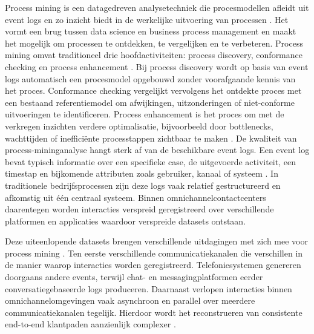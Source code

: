 Process mining is een datagedreven analysetechniek die procesmodellen afleidt uit event logs en zo inzicht biedt in de werkelijke uitvoering van processen \autocite{vanDerAalst2016}. Het vormt een brug tussen data science en business process management en maakt het mogelijk om processen te ontdekken, te vergelijken en te verbeteren.
Process mining omvat traditioneel drie hoofdactiviteiten: process discovery, conformance checking en process enhancement \autocite{vanDerAalst2016,Zelst2020}. Bij process discovery wordt op basis van event logs automatisch een procesmodel opgebouwd zonder voorafgaande kennis van het proces. Conformance checking vergelijkt vervolgens het ontdekte proces met een bestaand referentiemodel om afwijkingen, uitzonderingen of niet-conforme uitvoeringen te identificeren. Process enhancement  is het proces om met de verkregen inzichten verdere optimalisatie, bijvoorbeeld door bottlenecks, wachttijden of inefficiënte processtappen zichtbaar te maken \autocite{vanDerAalst2016}.
De kwaliteit van process-mininganalyse hangt sterk af van de beschikbare event logs. Een event log bevat typisch informatie over een specifieke case, de uitgevoerde activiteit, een timestap en bijkomende attributen zoals gebruiker, kanaal of systeem \autocite{vanDerAalst2016}. In traditionele bedrijfsprocessen zijn deze logs vaak relatief gestructureerd en afkomstig uit één centraal systeem. Binnen omnichannelcontactcenters daarentegen worden interacties verspreid geregistreerd over verschillende platformen en applicaties waardoor verspreide datasets ontstaan.

Deze uiteenlopende datasets brengen verschillende uitdagingen met zich mee voor process mining \autocite{Zelst2020}. Ten eerste verschillende communicatiekanalen die verschillen in de manier waarop interacties worden geregistreerd. Telefoniesystemen genereren doorgaans andere events, terwijl chat- en messagingplatformen eerder conversatiegebaseerde logs produceren. Daarnaast verlopen interacties binnen omnichannelomgevingen vaak asynchroon en parallel over meerdere communicatiekanalen tegelijk. Hierdoor wordt het reconstrueren van consistente end-to-end klantpaden aanzienlijk complexer \autocite{kalra2024}.

